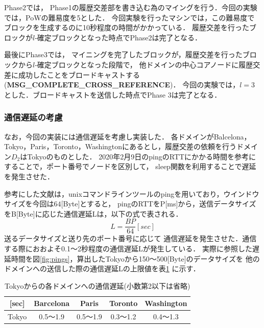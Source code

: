 \documentclass[a4paper,12pt]{jsarticle}
\begin{document}
Phase2では，
Phase1の履歴交差部を書き込む為のマイングを行う．今回の実験では，PoWの難易度を5とした．
今回実験を行ったマシンでは，この難易度でブロックを生成するのに10秒程度の時間がかかっている．
履歴交差を行ったブロックが$l$-確定ブロックとなった時点でPhase2は完了となる．

最後にPhase3では，
マイニングを完了したブロックが，履歴交差を行ったブロックから$l$-確定ブロックとなった段階で，
他ドメインの中心コアノードに履歴交差に成功したことをブロードキャストする
 (\textbf{MSG\_COMPLETE\_CROSS\_REFERENCE})．
今回の実験では，$l=3$とした．ブロードキャストを送信した時点でPhase 3は完了となる．



\subsubsection{通信遅延の考慮}

なお，今回の実装には通信遅延を考慮し実装した．
各ドメインがBalcelona，Tokyo，Paris，Toronto，Washingtonにあるとし，履歴交差の依頼を行うドメイン$D_2$はTokyoのものとした．
2020年2月9日のpingのRTTにかかる時間\cite{pings}を参考にすることで，ポート番号でノードを区別して，
sleep関数を利用することで遅延を発生させた．

参考にした文献\cite{pings}は，unixコマンドラインツールのpingを用いており，ウインドウサイズを今回は$64$[Byte]とすると，
pingのRTTをP[ms]から，送信データサイズをB[Byte]に応じた通信遅延Lは，以下の式で表される．
\begin{equation}
  \label{byt}
    L = \frac{BP}{64} [sec]
\end{equation}
送るデータサイズと送り先のポート番号に応じて
通信遅延を発生させた．通信する際におおよそ0.1〜2秒程度の通信遅延Lが発生している．
実際に参照した遅延時間を図\ref{fig:pings}，算出したTokyoから150〜500[Byte]のデータサイズを
他のドメインへの送信した際の通信遅延Lの上限値を表\ref{Byte} に示す．

\begin{table}[tbh]
  \centering
  \caption{Tokyoからの各ドメインへの通信遅延(小数第2以下は省略)}
  \label{Byte}
  \begin{tabular}{c|c|c|c|c|}
  \cline{2-5}
  [sec]                       & Barcelona &    Paris   &   Toronto  & Washington \\ \hline
  \multicolumn{1}{|c|}{Tokyo} &  0.5〜1.9 &  0.5〜1.9  &  0.3〜1.2  &  0.4〜1.3  \\ \hline
  \end{tabular}
\end{table}
\end{document}
